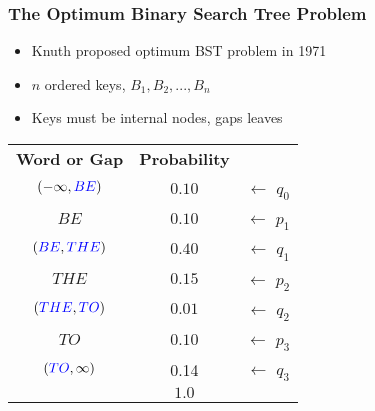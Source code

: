 \documentclass{beamer}
\theoremstyle{plain}
\begin{document}
\begin{frame} \frametitle{The Optimum Binary Search Tree Problem}

\begin{itemize}

\item Knuth proposed optimum BST problem in 1971 \cite{knuth1971optimum}

\item $n$ ordered keys, {\color{blue}$B_1, B_2, ..., B_n$}

\item Keys must be internal nodes, gaps leaves

\end{itemize}

\begin{center}
\begin{tabular}{ |c|c|c }\cline{1-2}
\cline{1-2}
 \textbf{Word or Gap} & \textbf{Probability} \\
 \cline{1-2}
 $(-\infty, {\color{blue}BE})$ & {\color{ForestGreen}$0.10$} & $\leftarrow$ {\color{ForestGreen} $ q_0$}\\ \cline{1-2}
 {\color{blue}$BE$} & {\color{TruePurple}$0.10$} & $\leftarrow$ {\color{TruePurple} $ p_1$}\\ \cline{1-2}
 $({\color{blue}BE}, {\color{blue}THE})$ & {\color{ForestGreen}$0.40$} & $\leftarrow$ {\color{ForestGreen} $ q_1$}\\ \cline{1-2}
 {\color{blue}$THE$} & {\color{TruePurple}$0.15$} & $\leftarrow$ {\color{TruePurple} $ p_2$}\\ \cline{1-2}
 $({\color{blue}THE}, {\color{blue}TO})$& {\color{ForestGreen}$0.01$} & $\leftarrow$ {\color{ForestGreen} $ q_2$}\\ \cline{1-2}
 {\color{blue}$TO$} & {\color{TruePurple}$0.10$} & $\leftarrow$ {\color{TruePurple} $ p_3$}\\ \cline{1-2}
 $({\color{blue}TO}, \infty)$ & {\color{ForestGreen}0.14} & $\leftarrow$ {\color{ForestGreen} $ q_3$}\\ \cline{1-2}
  & $\mathbf{1.0}$ \\ \cline{1-2}
\end{tabular}
\end{center}
\end{frame}
\end{document}
